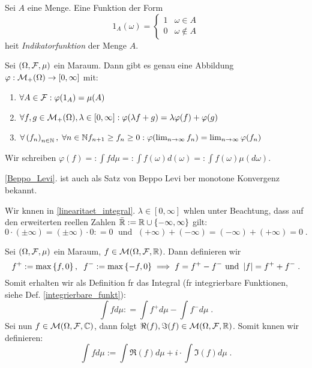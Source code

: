 \begin{definition}
	Sei $A$ eine Menge. Eine Funktion der Form
	\[1_A(\omega)=\begin{cases}1 & \omega \in A \\ 0 & \omega \not\in A\end{cases}\]
	hei\s t \textit{Indikatorfunktion} der Menge $A$.
\end{definition}
\begin{theorem}
	Sei \((\Omega, \mathcal{F}, \mu)\) ein Ma\s raum. Dann gibt es genau eine Abbildung \(\varphi: \mathcal{M}_+(\Omega) \to [0,\infty]\) mit:
	\begin{enumerate}
		\item \(\forall A \in \mathcal{F}: \varphi(1_A) = \mu(A)\)
		\item \(\forall f, g \in \mathcal{M}_+(\Omega), \lambda \in [0,\infty]: \varphi(\lambda f + g) = \lambda\varphi(f) + \varphi(g)\) \label{linearitaet_integral}
		\item \(\forall \left (f_n\right )_{n\in \mathbb{N}},\; \forall n \in \mathbb{N} f_{n+1} \geq f_{n} \geq 0: \varphi(\lim_{n \to \infty} f_n) = \lim_{n \to\infty} \varphi(f_n)\) \label{Beppo_Levi}
	\end{enumerate}
	Wir schreiben \(\varphi(f)  =: \int f d\mu =: \int f(\omega) d(\omega) =:\int f(\omega) \mu(d \omega)\).
\end{theorem}
\begin{rem}
	\ref{Beppo_Levi}. ist auch als Satz von Beppo Levi \us ber monotone Konvergenz bekannt.
\end{rem}
\begin{rem}
	Wir k\os nnen in \ref{linearitaet_integral}. \(\lambda \in [0, \infty]\) w\as hlen unter Beachtung, dass auf den erweiterten reellen Zahlen \(\bar{\mathbb{R}} := \mathbb{R} \cup \left\{-\infty, \infty\right\}\) gilt:
	\[0\cdot (\pm \infty) = (\pm \infty) \cdot 0 : = 0 \;\text{ und }\; (+\infty) + (-\infty) = (-\infty) + (+\infty) = 0\;.\]
\end{rem}
\begin{definition}
	Sei \((\Omega, \mathcal{F}, \mu)\) ein Ma\s raum, \(f\in \mathcal{M}(\Omega, \mathcal{F}, \mathbb{R})\). Dann definieren wir
	\[f^+ := \max\left\{f,0\right\}, \;\; f^- := \max\left\{-f,0\right\} \implies f = f^+ - f^- \text{ und } \left\lvert f \right\rvert = f^+ + f^-\;.\]
	Somit erhalten wir als Definition f\us r das Integral (f\us r integrierbare Funktionen, siehe Def. \ref{integrierbare_funkt}):
	\[\int f d\mu : = \int f^+ d\mu - \int f^- d\mu\;.\]
	Sei nun \(f\in \mathcal{M}(\Omega, \mathcal{F},\mathbb{C})\), dann folgt \(\Re(f), \Im(f) \in \mathcal{M} (\Omega, \mathcal{F}, \mathbb{R})\). Somit k\os nnen wir definieren:
	\[\int f d\mu := \int \Re(f) d\mu + i \cdot \int \Im(f) d\mu\;.\]
\end{definition}

